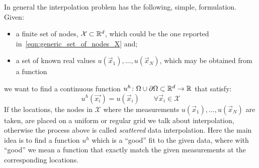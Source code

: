 \smallskip
In general the interpolation problem has the following, simple, formulation. Given:
\begin{itemize}
	\item a finite set of nodes,  $\mathcal{X} \subset \mathbb{R}^d$, which could be the one reported in~\eqref{eqn:generic_set_of_nodes_X} and;
	\item a set of known real values $u(\vec{x}_1), \dots, u(\vec{x}_N)$, which may be obtained from a function
\end{itemize}
we want to find a continuous function $u^{h} \colon \Omega\cup\partial\Omega\subset\mathbb{R}^{d} \to \mathbb{R}$ that satisfy:
\begin{equation}
	\label{eqn:interpolation_constraints}
	u^{h}(\vec{x_i}) = u(\vec{x}_i) \qquad  \forall \vec{x}_i \in \mathcal{X}
\end{equation}
If the locations, the nodes in $\mathcal{X}$ where the measurements $u(\vec{x}_1), \dots, u(\vec{x}_N)$ are taken, are placed on a uniform or regular grid we talk about interpolation, otherwise the process above is called \emph{scattered} data interpolation. Here the main idea is to find a function $u^h$ which is a ``good''  fit to the given data, where with ``good'' we mean a function that exactly match the given measurements at the corresponding locations.

